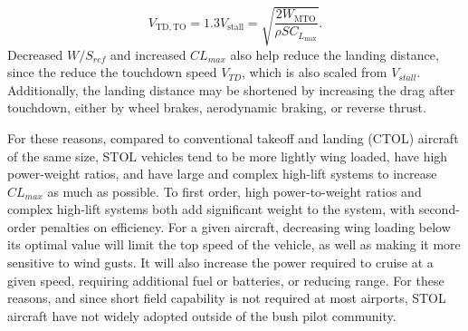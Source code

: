 \documentclass[]{aiaa-tc}%
\begin{document}
\begin{equation}
    \label{e:stall}
    V_{\mathrm{TD,TO}} = 1.3V_{\mathrm{stall}} = \sqrt{\frac{2W_{\mathrm{MTO}}}{\rho S C_{L_{\mathrm{max}}}}}.
\end{equation}
Decreased $W/S_{ref}$ and increased $CL_{max}$ also help reduce the landing distance, since the reduce the touchdown speed $V_{TD}$, which is also scaled from $V_{stall}$.  Additionally, the landing distance may be shortened by increasing the drag after touchdown, either by wheel brakes, aerodynamic braking, or reverse thrust.  

For these reasons, compared to conventional takeoff and landing (CTOL) aircraft of the same size, STOL vehicles tend to be more lightly wing loaded, have high power-weight ratios, and have large and complex high-lift systems to increase $CL_{max}$ as much as possible.  To first order, high power-to-weight ratios and complex high-lift systems both add significant weight to the system, with second-order penalties on efficiency.  For a given aircraft, decreasing wing loading below its optimal value will limit the top speed of the vehicle, as well as making it more sensitive to wind gusts.  It will also increase the power required to cruise at a given speed, requiring additional fuel or batteries, or reducing range.  For these reasons, and since short field capability is not required at most airports, STOL aircraft have not widely adopted outside of the bush pilot community. 
\end{document}
